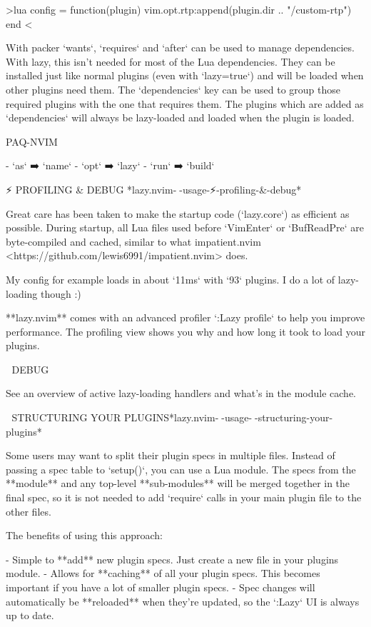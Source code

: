 \begin{listing}
>lua
    config = function(plugin)
        vim.opt.rtp:append(plugin.dir .. "/custom-rtp")
    end
<

With packer `wants`, `requires` and `after` can be used to manage dependencies.
With lazy, this isn’t needed for most of the Lua dependencies. They can be
installed just like normal plugins (even with `lazy=true`) and will be loaded
when other plugins need them. The `dependencies` key can be used to group those
required plugins with the one that requires them. The plugins which are added
as `dependencies` will always be lazy-loaded and loaded when the plugin is
loaded.


PAQ-NVIM ~

- `as` ➡️ `name`
- `opt` ➡️ `lazy`
- `run` ➡️ `build`


⚡ PROFILING & DEBUG             *lazy.nvim-🚀-usage-⚡-profiling-&-debug*

Great care has been taken to make the startup code (`lazy.core`) as efficient
as possible. During startup, all Lua files used before `VimEnter` or
`BufReadPre` are byte-compiled and cached, similar to what impatient.nvim
<https://github.com/lewis6991/impatient.nvim> does.

My config for example loads in about `11ms` with `93` plugins. I do a lot of
lazy-loading though :)

**lazy.nvim** comes with an advanced profiler `:Lazy profile` to help you
improve performance. The profiling view shows you why and how long it took to
load your plugins.


🐛 DEBUG ~

See an overview of active lazy-loading handlers and what’s in the module
cache.


📂 STRUCTURING YOUR PLUGINS*lazy.nvim-🚀-usage-📂-structuring-your-plugins*

Some users may want to split their plugin specs in multiple files. Instead of
passing a spec table to `setup()`, you can use a Lua module. The specs from the
**module** and any top-level **sub-modules** will be merged together in the
final spec, so it is not needed to add `require` calls in your main plugin file
to the other files.

The benefits of using this approach:

- Simple to **add** new plugin specs. Just create a new file in your plugins module.
- Allows for **caching** of all your plugin specs. This becomes important if you have a lot of smaller plugin specs.
- Spec changes will automatically be **reloaded** when they’re updated, so the `:Lazy` UI is always up to date.


\end{listing}
